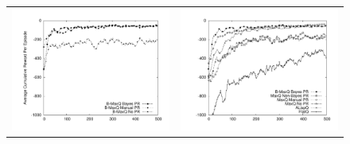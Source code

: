\renewcommand{\arraystretch}{0}
\begin{figure}[t]
\centering
\begin{tabular}{cc}
\includegraphics[trim=50 50 30 50, clip, scale=0.25]{exp/Taxi_Modified_b.pdf} & 
\includegraphics[trim=50 50 30 50, clip, scale=0.25]{exp/Taxi_Modified_nb.pdf} \\

\end{tabular}
\end{figure}
